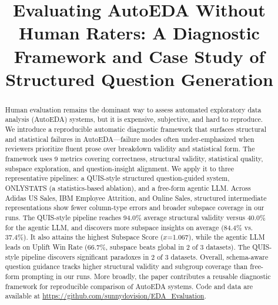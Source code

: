 \documentclass[conference]{IEEEtran}
\begin{document}
\title{Evaluating AutoEDA Without Human Raters: A Diagnostic Framework and Case Study of Structured Question Generation}

\author{
}

\maketitle

\begin{abstract}
Human evaluation remains the dominant way to assess automated exploratory data analysis (AutoEDA) systems, but it is expensive, subjective, and hard to reproduce. We introduce a reproducible automatic diagnostic framework that surfaces structural and statistical failures in AutoEDA---failure modes often under-emphasized when reviewers prioritize fluent prose over breakdown validity and statistical form. The framework uses 9 metrics covering correctness, structural validity, statistical quality, subspace exploration, and question-insight alignment. We apply it to three representative pipelines: a QUIS-style structured question-guided system, ONLYSTATS (a statistics-based ablation), and a free-form agentic LLM. Across Adidas US Sales, IBM Employee Attrition, and Online Sales, structured intermediate representations show fewer column-type errors and broader subspace coverage in our runs. The QUIS-style pipeline reaches 94.0\% average structural validity versus 40.0\% for the agentic LLM, and discovers more subspace insights on average (84.4\% vs. 37.4\%). It also attains the highest Subspace Score ($x$=1.067), while the agentic LLM leads on Uplift Win Rate (66.7\%, subspace beats global in 2 of 3 datasets). The QUIS-style pipeline discovers significant paradoxes in 2 of 3 datasets. Overall, schema-aware question guidance tracks higher structural validity and subgroup coverage than free-form prompting in our runs. More broadly, the paper contributes a reusable diagnostic framework for reproducible comparison of AutoEDA systems. Code and data are available at \href{https://github.com/sunnydovision/EDA_Evaluation}{https://github.com/sunnydovision/EDA\_Evaluation}.
\end{abstract}
\end{document}
